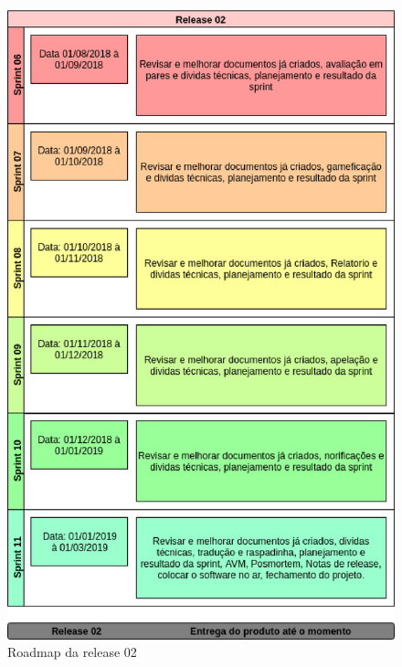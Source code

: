 \begin{apendicesenv}
\begin{figure}[h!]
	\centering
  \includegraphics[keepaspectratio=true,scale=0.8]{figuras/roadmap2.eps}
  \caption{Roadmap da release 02}
	\label{fig:roadmap2}
\end{figure}

\end{apendicesenv}
